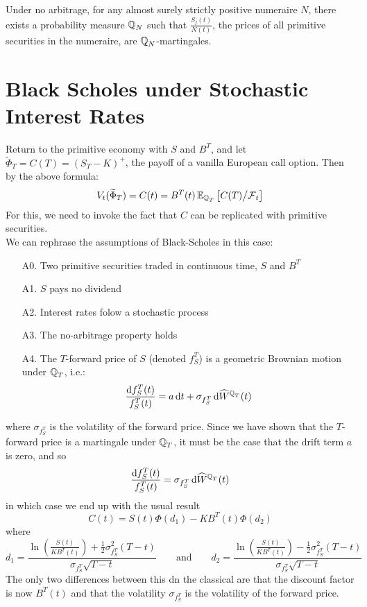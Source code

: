 \documentclass[11pt]{article}
\begin{document}
\begin{theorem}
Under no arbitrage, for any almost surely strictly positive numeraire $N$, there exists a probability measure $\operatorname{\mathbb Q}_N$ such that $\frac{S_j(t)}{N(t)}$, the prices of all primitive securities in the numeraire, are $\operatorname{\mathbb Q}_N$-martingales.
\end{theorem}

\section{Black Scholes under Stochastic Interest Rates}
Return to the primitive economy with $S$ and $B^T$, and let $\widetilde{\Phi}_T = C(T) = (S_T - K)^+$, the payoff of a vanilla European call option. Then by the above formula: 
$$ V_t(\widetilde{\Phi}_T) = C(t) = B^T(t) \operatorname{\mathbb E}_{\operatorname{\mathbb Q}_T} \left[ C(T) \middle/ \operatorname{\mathcal F}_t \right]$$
For this, we need to invoke the fact that $C$ can be replicated with primitive securities. \\

We can rephrase the assumptions of Black-Scholes in this case:
\begin{enumerate}
\item[A0.] Two primitive securities traded in continuous time, $S$ and $B^T$
\item[A1.] $S$ pays no dividend
\item[A2.] Interest rates folow a stochastic process
\item[A3.] The no-arbitrage property holds
\item[A4.] The $T$-forward price of $S$ (denoted $f_S^T$) is a geometric Brownian motion under $\operatorname{\mathbb Q}_T$, i.e.:
$$ \frac{\dif f_S^T(t)}{f_S^T(t)} = a \dif t + \sigma_{f_S^T} \dif \widehat{W}^{\Qmeas_T}(t)$$
\end{enumerate}
where $\sigma_{f_S^T}$ is the volatility of the forward price. Since we have shown that the $T$-forward price is a martingale under $\operatorname{\mathbb Q}_T$, it must be the case that the drift term $a$ is zero, and so
$$ \frac{\dif f_S^T(t)}{f_S^T(t)} = \sigma_{f_S^T} \dif \widehat{W}^{\Qmeas_T}(t)$$
in which case we end up with the usual result
$$ C(t) = S(t) \Phi(d_1) - K B^T(t) \Phi(d_2)$$
where
$$d_1 = \frac{\ln \left( \frac{S(t)}{K B^T(t)}\right) + \frac{1}{2}\sigma_{f_S^T}^2(T-t)}{\sigma_{f_S^T} \sqrt{T-t}} \qquad \text{and} \qquad d_2 = \frac{\ln \left( \frac{S(t)}{K B^T(t)}\right) - \frac{1}{2}\sigma_{f_S^T}^2(T-t)}{\sigma_{f_S^T} \sqrt{T-t}}$$
The only two differences between this dn the classical are that the discount factor is now $B^T(t)$ and that the volatility $\sigma_{f_S^T}$ is the volatility of the forward price. 
\end{document}
